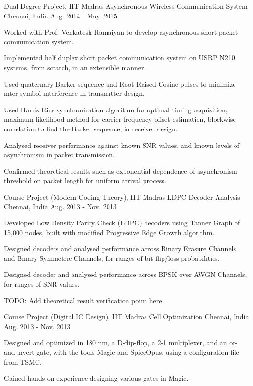 \begin{cventries}
	\cventry
	{Dual Degree Project, IIT Madras}
	{Asynchronous Wireless Communication System}
	{Chennai, India}
	{Aug. 2014 - May. 2015}
	{
		\begin{cvitems}
			\item{Worked with Prof. Venkatesh Ramaiyan to develop asynchronous short packet communication system.}
			\item{Implemented half duplex short packet communication system on USRP N210 systems, from scratch, in an extensible manner.}
			\item{Used quaternary Barker sequence and Root Raised Cosine pulses to minimize inter-symbol interference in transmitter design.}
			\item{Used Harris Rice synchronization algorithm for optimal timing acquisition, maximum likelihood method for carrier frequency offset estimation, blockwise correlation to find the Barker sequence, in receiver design.}
			\item{Analysed receiver performance against known SNR values, and known levels of asynchronism in packet transmission.}
			\item{Confirmed theoretical results such as exponential dependence of asynchronism threshold on packet length for uniform arrival process.}
		\end{cvitems}
	}

	\cventry
	{Course Project (Modern Coding Theory), IIT Madras}
	{LDPC Decoder Analysis}
	{Chennai, India}
	{Aug. 2013 - Nov. 2013}
	{
		\begin{cvitems}
			\item{Developed Low Density Parity Check (LDPC) decoders using Tanner Graph of 15,000 nodes, built with modified Progressive Edge Growth algorithm.}
			\item{Designed decoders and analysed performance across Binary Erasure Channels and Binary Symmetric Channels, for ranges of bit flip/loss probabilities.}
			\item{Designed decoder and analysed performance across BPSK over AWGN Channels, for ranges of SNR values.}
			\item{TODO: Add theoretical result verification point here.}
		\end{cvitems}
	}

	\cventry
	{Course Project (Digital IC Design), IIT Madras}
	{Cell Optimization}
	{Chennai, India}
	{Aug. 2013 - Nov. 2013}
	{
		\begin{cvitems}
			\item{Designed and optimized in 180 nm, a D-flip-flop, a 2-1 multiplexer, and an or-and-invert gate, with the tools Magic and SpiceOpus, using a configuration file from TSMC.}
			\item{Gained hands-on experience designing various gates in Magic.}
		\end{cvitems}
	}

\end{cventries}
